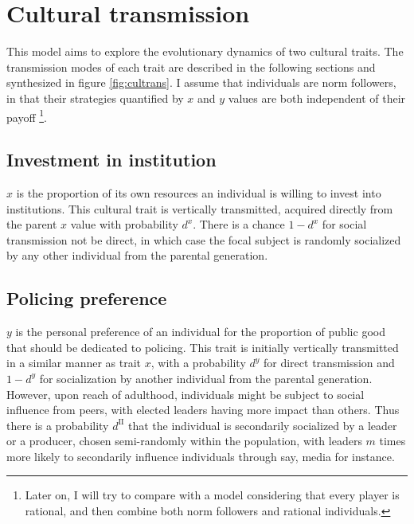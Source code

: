 \documentclass[a4paper]{article}
\begin{document}
\section{Cultural transmission}
\label{sec:trans}

This model aims to explore the evolutionary dynamics of two cultural traits. The transmission modes of each trait are described in the following sections and synthesized in figure \ref{fig:cultrans}. I assume that individuals are norm followers, in that their strategies quantified by $x$ and $y$ values are both independent of their payoff \footnote{Later on, I will try to compare with a model considering that every player is rational, and then combine both norm followers and rational individuals.}. 

\subsection{Investment in institution}

$x$ is the proportion of its own resources an individual is willing to invest into institutions. This cultural trait is vertically transmitted, acquired directly from the parent $x$ value with probability $d^x$. There is a chance $1-d^x$ for social transmission not be direct, in which case the focal subject is randomly socialized by any other individual from the parental generation.

\subsection{Policing preference}

$y$ is the personal preference of an individual for the proportion of public good that should be dedicated to policing. This trait is initially vertically transmitted in a similar manner as trait $x$, with a probability $d^y$ for direct transmission and $1-d^y$ for socialization by another individual from the parental generation. However, upon reach of adulthood, individuals might be subject to social influence from peers, with elected leaders having more impact than others. Thus there is a probability $d^{\text{II}}$ that the individual is secondarily socialized by a leader or a producer, chosen semi-randomly within the population, with leaders $m$ times more likely to secondarily influence individuals through say, media for instance.  
\end{document}

